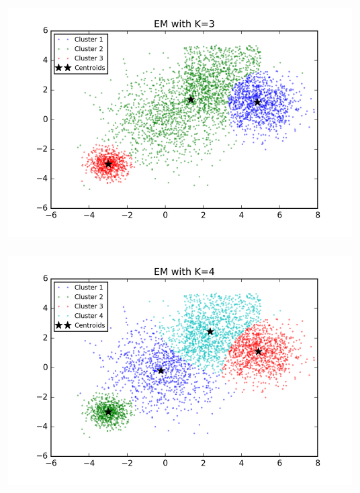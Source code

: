 \begin{figure}[htb]
        \centering
        \begin{subfigure}[b]{0.475\textwidth}
            \centering
            \includegraphics[width=\textwidth]{./figures/bigClustering_EM_3.png}
        \end{subfigure}
        \hfill
        \begin{subfigure}[b]{0.475\textwidth}  
            \centering 
            \includegraphics[width=\textwidth]{./figures/bigClustering_EM_4.png}
        \end{subfigure}
        \begin{subfigure}[b]{0.475\textwidth}  
            \centering 

\end{subfigure}
\end{figure}
